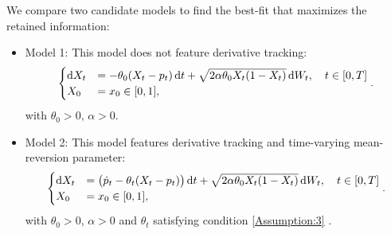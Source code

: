 \documentclass[11pt]{article}
\theoremstyle{definition}
\begin{document}
We compare two candidate models to find the best-fit that maximizes the retained information:
\begin{itemize}
  \item Model 1: This model does not feature derivative tracking:
\begin{equation}
\begin{cases}
\dif X_t&=-\theta_0 (X_t - p_t) \dif t +\sqrt{2 \alpha \theta_0 X_t (1 - X_t)} \dif W_t, \quad t \in [0,T]  \\
X_0&=x_0\in [0,1],
\end{cases}.  \label{Model1}
\end{equation}
 with $\theta_0 > 0, \, \alpha > 0$.

%  

  \item Model 2: This model features derivative tracking and time-varying mean-reversion parameter:  
\begin{equation}
\begin{cases}
\dif X_t&= \big(\dot{p}_t  - \theta_t (X_t - p_t) \big) \dif t +\sqrt{2 \alpha \theta_0 X_t (1 - X_t)} \dif W_t, \quad t \in [0,T]\\
X_0&=x_0\in [0,1],
\end{cases}.  \label{Model2}
\end{equation}
 with $\theta_0 > 0$, $\alpha > 0$ and $\theta_t$ satisfying condition \eqref{Assumption:3} .
\end{itemize}
\end{document}
